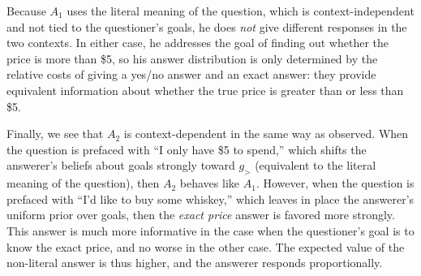 \documentclass[11pt, floatsintext]{apa6}
\begin{document}
Because $A_1$ uses the literal meaning of the question, which is context-independent and not tied to the questioner's goals, he does \emph{not} give different responses in the two contexts. 
In either case, he addresses the goal of finding out whether the price is more than \$5, so his answer distribution is only determined by the relative costs of giving a yes/no answer and an exact answer: they provide equivalent information about whether the true price is greater than or less than \$5. 

Finally, we see that $A_2$ is context-dependent in the same way as  observed. 
When the question is prefaced with ``I only have \$5 to spend,'' which shifts the answerer's beliefs about goals strongly toward $g_>$ (equivalent to the literal meaning of the question), then $A_2$ behaves like $A_1$. 
However, when the question is prefaced with ``I'd like to buy some whiskey,'' which leaves in place the answerer's uniform prior over goals, then the \emph{exact price} answer is favored more strongly. This answer is much more informative in the case when the questioner's goal is to know the exact price, and no worse in the other case. The expected value of the non-literal answer is thus higher, and the answerer responds proportionally. 

\end{document}
